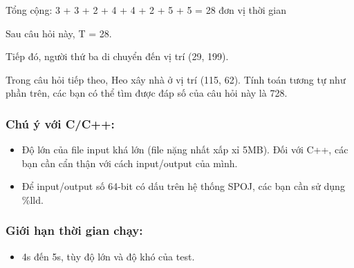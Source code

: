   Tổng cộng: 3 + 3 + 2 + 4 + 4 + 2 + 5 + 5 = 28 đơn vị thời gian  

   Sau câu hỏi này, T = 28.  

   Tiếp đó, người thứ ba di chuyển đến vị trí (29, 199).  

   Trong câu hỏi tiếp theo, Heo xây nhà ở vị trí (115, 62). Tính toán tương tự như phần trên, các bạn có thể tìm được đáp số của câu hỏi này là 728.  

\subsubsection{   Chú ý với C/C++:  }
\begin{itemize}
	\item     Độ lớn của file input khá lớn (file nặng nhất xấp xỉ 5MB). Đối với C++, các bạn cần cẩn thận với cách input/output của mình.   
	\item     Để input/output số 64-bit có dấu trên hệ thống SPOJ, các bạn cần sử dụng \%lld.   
\end{itemize}

\subsubsection{   Giới hạn thời gian chạy:  }
\begin{itemize}
	\item     4s đến 5s, tùy độ lớn và độ khó của test.   
\end{itemize}